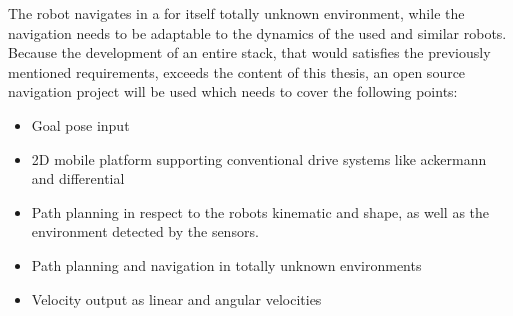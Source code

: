 The robot navigates in a for itself totally unknown environment, while the navigation needs to be adaptable to the dynamics of the used and similar robots. Because the development of an entire stack, that would satisfies the previously mentioned requirements, exceeds the content of this thesis, an open source navigation project will be used which needs to cover the following points:
\begin{itemize}
	\item Goal pose input
	\item 2D mobile platform supporting conventional drive systems like ackermann and differential
	\item Path planning in respect to the robots kinematic and shape, as well as the environment detected by the sensors.
	\item Path planning and navigation in totally unknown environments
	\item Velocity output as linear and angular velocities
\end{itemize}










